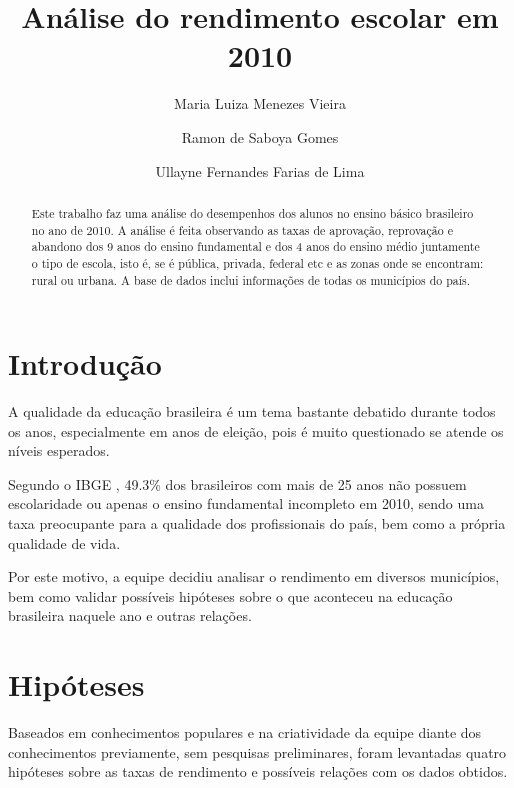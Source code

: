 \documentclass[review]{elsarticle}
\begin{document}
\begin{frontmatter}

\title{Análise do rendimento escolar em 2010}

\author{Maria Luiza Menezes Vieira}
\author{Ramon de Saboya Gomes}
\author{Ullayne Fernandes Farias de Lima}
\address{Universidade Federal de Pernambuco - Centro de Informática\\
Caixa Postal 7.851 - 50.732-970 - Recife, PE - Brasil}

\begin{abstract}
Este trabalho faz uma análise do desempenhos dos alunos no ensino básico brasileiro no ano de 2010. A análise é feita observando as taxas de aprovação, reprovação e abandono dos 9 anos do ensino fundamental e dos 4 anos do ensino médio juntamente o tipo de escola, isto é, se é pública, privada, federal etc e as zonas onde se encontram: rural ou urbana. A base de dados inclui informações de todas os municípios do país.\par
\end{abstract}

\end{frontmatter}

\linenumbers

\section{Introdução}

A qualidade da educação brasileira é um tema bastante debatido durante todos os anos, especialmente em anos de eleição, pois é muito questionado se atende os níveis esperados.\par
Segundo o IBGE \cite{G12012}, 49.3\% dos brasileiros com mais de 25 anos não possuem escolaridade ou apenas o ensino fundamental incompleto em 2010, sendo uma taxa preocupante para a qualidade dos profissionais do país, bem como a própria qualidade de vida.\par
Por este motivo, a equipe decidiu analisar o rendimento em diversos municípios, bem como validar possíveis hipóteses sobre o que aconteceu na educação brasileira naquele ano e outras relações.\par

\section{Hipóteses}
Baseados em conhecimentos populares e na criatividade da equipe diante dos conhecimentos previamente, sem pesquisas preliminares, foram levantadas quatro hipóteses sobre as taxas de rendimento e possíveis relações com os dados obtidos.\par
\end{document}
